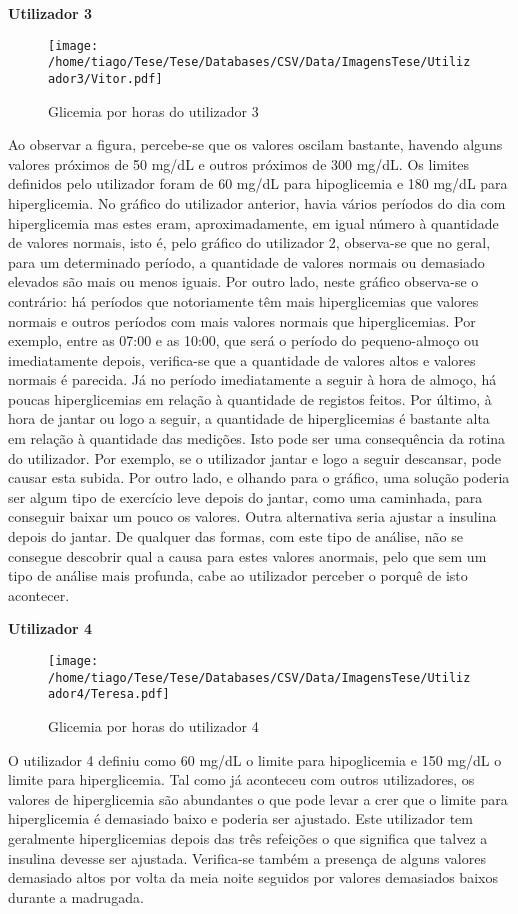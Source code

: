 \textbf{Utilizador 3}

\begin{figure}[H]
\centering
\texttt{[image: /home/tiago/Tese/Tese/Databases/CSV/Data/ImagensTese/Utilizador3/Vitor.pdf]}
\caption{Glicemia por horas do utilizador 3}
\end{figure}
Ao observar a figura, percebe-se que os valores oscilam bastante, havendo alguns valores próximos de 50 mg/dL e outros próximos de 300 mg/dL. Os limites definidos pelo utilizador foram de 60 mg/dL para hipoglicemia e 180 mg/dL para hiperglicemia. No gráfico do utilizador anterior, havia vários períodos do dia com hiperglicemia mas estes eram, aproximadamente, em igual número à quantidade de valores normais, isto é, pelo gráfico do utilizador 2, observa-se que no geral, para um determinado período, a quantidade de valores normais ou demasiado elevados são mais ou menos iguais. Por outro lado, neste gráfico observa-se o contrário: há períodos que notoriamente têm mais hiperglicemias que valores normais e outros períodos com mais valores normais que hiperglicemias. 
Por exemplo, entre as 07:00 e as 10:00, que será o período do pequeno-almoço ou imediatamente depois, verifica-se que a quantidade de valores altos e valores normais é parecida. Já no período imediatamente a seguir à hora de almoço, há poucas hiperglicemias em relação à quantidade de registos feitos. Por último, à hora de jantar ou logo a seguir, a quantidade de hiperglicemias é bastante alta em relação à quantidade das medições. Isto pode ser uma consequência da rotina do utilizador. Por exemplo, se o utilizador jantar e logo a seguir descansar, pode causar esta subida. Por outro lado, e olhando para o gráfico, uma solução poderia ser algum tipo de exercício leve depois do jantar, como uma caminhada, para conseguir baixar um pouco os valores. Outra alternativa seria ajustar a insulina depois do jantar. 
De qualquer das formas, com este tipo de análise, não se consegue descobrir qual a causa para estes valores anormais, pelo que sem um tipo de análise mais profunda, cabe ao utilizador perceber o porquê de isto acontecer.



\textbf{Utilizador 4}

\begin{figure}[H]
\centering
\texttt{[image: /home/tiago/Tese/Tese/Databases/CSV/Data/ImagensTese/Utilizador4/Teresa.pdf]}
\caption{Glicemia por horas do utilizador 4}
\end{figure}
O utilizador 4 definiu como 60 mg/dL o limite para hipoglicemia e 150 mg/dL o limite para hiperglicemia. Tal como já aconteceu com outros utilizadores, os valores de hiperglicemia são abundantes o que pode levar a crer que o limite para hiperglicemia é demasiado baixo e poderia ser ajustado. Este utilizador tem geralmente hiperglicemias depois das três refeições o que significa que talvez a insulina devesse ser ajustada. Verifica-se também a presença de alguns valores demasiado altos por volta da meia noite seguidos por valores demasiados baixos durante a madrugada. 


